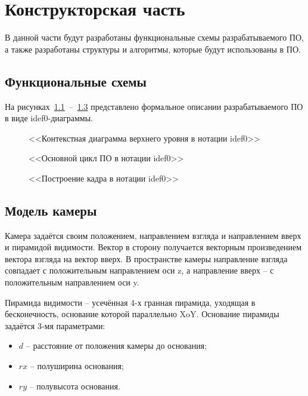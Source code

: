 \chapter{Конструкторская часть}

В данной части будут разработаны функциональные схемы разрабатываемого ПО, а также разработаны структуры и алгоритмы, которые будут использованы в ПО.

\section{Функциональные схемы} 

На рисунках~\ref{fig:A0}~--~\ref{fig:A3} представлено формальное описании разрабатываемого ПО в виде idef0-диаграммы.

\begin{figure}[H]
	\centering
	
	\caption{<<Контекстная диаграмма верхнего уровня в нотации idef0>>}
	\label{fig:A0}
\end{figure}

\begin{figure}[H]
	\centering
	
	\caption{<<Основной цикл ПО в нотации idef0>>}
	\label{fig:A1}
\end{figure}

\begin{figure}[H]
	\centering
	
	\caption{<<Построение кадра в нотации idef0>>}
	\label{fig:A3}
\end{figure}

\section{Модель камеры}

Камера задаётся своим положением, направлением взгляда и направлением вверх и пирамидой видимости. Вектор в сторону получается векторным произведением вектора взгляда на вектор вверх. В пространстве камеры направление взгляда совпадает с положительным направлением оси z, а направление вверх -- с положительным направлением оси y.

Пирамида видимости -- усечённая 4-х гранная пирамида, уходящая в бесконечность, основание которой параллельно XoY. Основание пирамиды задаётся 3-мя параметрами:

\begin{itemize}
	\item $d$ -- расстояние от положения камеры до основания;
	\item $rx$ -- полуширина основания;
	\item $ry$ -- полувысота основания.
\end{itemize}

